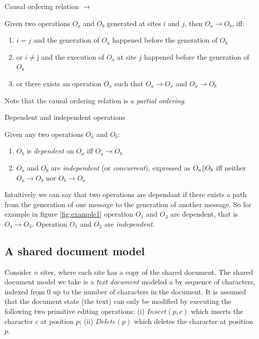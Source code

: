 \documentclass[11pt,a4paper]{article}
\begin{document}
\begin{defn}
Causal ordering relation $\rightarrow$
\end{defn}

Given two operations $O_{a}$ and $O_{b}$ generated at sites $i$ and $j$, then $O_{a}\rightarrow O_{b}$, iff:
\begin{enumerate}
 \item $i=j$ and the generation of $O_{a}$ happened before the generation of 
       $O_{b}$
 \item or $i \neq $j and the execution of $O_{a}$ at site $j$ happened before 
       the generation of $O_{b}$
 \item or there exists an operation $O_{x}$ such that $O_{a}\rightarrow O_{x}$
       and $O_{x}\rightarrow O_{b}$
\end{enumerate}

Note that the causal ordering relation is a \emph{partial ordering}.

\begin{defn}
Dependent and independent operations
\end{defn}

Given any two operations $O_{a}$ and $O_{b}$:
\begin{enumerate}
 \item $O_{b}$ is \emph{dependent} on $O_{a}$ iff $O_{a} \rightarrow O_{b}$
 \item $O_{a}$ and $O_{b}$ are \emph{independent} (or \emph{concurrent}), 
       expressed as $O_{a} \Arrowvert O_{b}$ iff neither 
       $O_{a}\rightarrow O_{b}$ nor $O_{b}\rightarrow O_{a}$
\end{enumerate}

Intuitively we can say that two operations are dependant if there exists a path from the generation of one message to the generation of another message. So for example in figure \ref{fig:example1} operation $O_{1}$ and $O_{3}$ are dependent, that is $O_{1}\rightarrow O_{3}$. Operation $O_{1}$ and $O_{2}$ are \emph{independent}. 


\subsection{A shared document model}
Consider $n$ sites, where each site has a copy of the shared document. The shared document model we take is a \emph{text document} modeled a by sequence of characters, indexed from 0 up to the number of characters in the document. It is assumed that the document state (the text) can only be modified by executing the following two primitive editing operations: (i) $Insert(p,c)$ which inserts the character $c$ at position $p$; (ii) $Delete(p)$ which deletes the character at position $p$.
\end{document}
